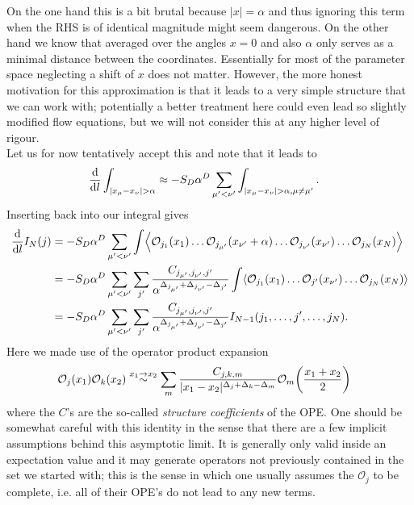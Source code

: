 \documentclass[english, parskip=full]{scrartcl}
\begin{document}
On the one hand this is a bit brutal because $|x|=\alpha$ and thus ignoring this term when the RHS is of identical magnitude might seem dangerous.
On the other hand we know that averaged over the angles $x=0$ and also $\alpha$ only serves as a minimal distance between the coordinates.
Essentially for most of the parameter space neglecting a shift of $x$ does not matter.
However, the more honest motivation for this approximation is that it leads to a very simple structure that we can work with; potentially a better treatment here could even lead so slightly modified flow equations, but we will not consider this at any higher level of rigour.\\
Let us for now tentatively accept this and note that it leads to
\begin{align}
\frac{\d}{\d l}\int_{|x_\mu - x_\nu|>\alpha} &\approx -S_D\alpha^D \sum_{\mu'<\nu'} \int_{|x_\mu - x_\nu|>\alpha,\mu\neq \mu'}.
\end{align}
Inserting back into our integral gives
\begin{align}
\frac{\d}{\d l} I_N(j) &= -S_D\alpha^D \sum_{\mu'<\nu'} \int \bra*{\mathcal{O}_{j_1}(x_1) \dots \mathcal{O}_{j_{\mu'}}(x_{\nu'}+\alpha)\dots \mathcal{O}_{j_{\nu'}}(x_{\nu'}) \dots \mathcal{O}_{j_{N}}(x_{N})}\\
&=-S_D\alpha^D \sum_{\mu'<\nu'} \sum_{j'} \frac{C_{j_{\mu'}, j_{\nu'}, j'}}{\alpha^{\Delta_{j_{\mu'}} + \Delta_{j_{\nu'}} - \Delta_{j'}}} \int \bra*{\mathcal{O}_{j_1}(x_1) \dots \mathcal{O}_{j'}(x_{\nu'}) \dots \mathcal{O}_{j_{N}}(x_{N})}\\
&=-S_D\alpha^D \sum_{\mu'<\nu'} \sum_{j'} \frac{C_{j_{\mu'}, j_{\nu'}, j'}}{\alpha^{\Delta_{j_{\mu'}} + \Delta_{j_{\nu'}} - \Delta_{j'}}} I_{N-1}(j_1,\dots, j',\dots, j_N). \label{eqn:1loop shell integral OPE}
\end{align}
Here we made use of the operator product expansion
\begin{align}
\mathcal{O}_j(x_1) \mathcal{O}_k(x_2) &\overset{x_1\rightarrow x_2}{\sim} \sum_m \frac{C_{j,k,m}}{|x_1-x_2|^{\Delta_{j} + \Delta_{k} - \Delta_{m}}} \mathcal{O}_m\kla*{\frac{x_1+x_2}{2}}
\end{align}
where the $C$'s are the so-called \emph{structure coefficients} of the OPE.
One should be somewhat careful with this identity in the sense that there are a few implicit assumptions behind this asymptotic limit.
It is generally only valid inside an expectation value and it may generate operators not previously contained in the set we started with; this is the sense in which one usually assumes the $\mathcal{O}_j$ to be complete, i.e. all of their OPE's do not lead to any new terms.
\end{document}
